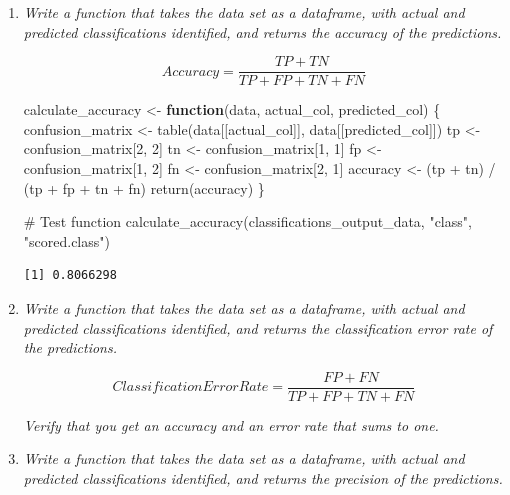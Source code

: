 \documentclass[
  11pt]{article}
\newenvironment{Shaded}{\begin{snugshade}}{\end{snugshade}}
\newcommand{\CommentTok}[1]{\textcolor[rgb]{0.37,0.37,0.37}{#1}}
\newcommand{\ControlFlowTok}[1]{\textcolor[rgb]{0.00,0.23,0.31}{\textbf{#1}}}
\newcommand{\DecValTok}[1]{\textcolor[rgb]{0.68,0.00,0.00}{#1}}
\newcommand{\FunctionTok}[1]{\textcolor[rgb]{0.28,0.35,0.67}{#1}}
\newcommand{\NormalTok}[1]{\textcolor[rgb]{0.00,0.23,0.31}{#1}}
\newcommand{\OtherTok}[1]{\textcolor[rgb]{0.00,0.23,0.31}{#1}}
\newcommand{\SpecialCharTok}[1]{\textcolor[rgb]{0.37,0.37,0.37}{#1}}
\newcommand{\StringTok}[1]{\textcolor[rgb]{0.13,0.47,0.30}{#1}}
\begin{document}
\begin{enumerate}
\def\labelenumi{\arabic{enumi}.}
\setcounter{enumi}{2}
\item
  \emph{Write a function that takes the data set as a dataframe, with
  actual and predicted classifications identified, and returns the
  accuracy of the predictions.}

  \[
  𝐴𝑐𝑐𝑢𝑟𝑎𝑐𝑦 = \frac{𝑇𝑃 + 𝑇𝑁}{𝑇𝑃 + 𝐹𝑃 + 𝑇𝑁 + 𝐹𝑁}
  \]

\begin{Shaded}
\begin{Highlighting}[]
\NormalTok{calculate\_accuracy }\OtherTok{\textless{}{-}} \ControlFlowTok{function}\NormalTok{(data, actual\_col, predicted\_col) \{}
\NormalTok{confusion\_matrix }\OtherTok{\textless{}{-}} \FunctionTok{table}\NormalTok{(data[[actual\_col]], data[[predicted\_col]])}
\NormalTok{tp }\OtherTok{\textless{}{-}}\NormalTok{ confusion\_matrix[}\DecValTok{2}\NormalTok{, }\DecValTok{2}\NormalTok{]}
\NormalTok{tn }\OtherTok{\textless{}{-}}\NormalTok{ confusion\_matrix[}\DecValTok{1}\NormalTok{, }\DecValTok{1}\NormalTok{]}
\NormalTok{fp }\OtherTok{\textless{}{-}}\NormalTok{ confusion\_matrix[}\DecValTok{1}\NormalTok{, }\DecValTok{2}\NormalTok{]}
\NormalTok{fn }\OtherTok{\textless{}{-}}\NormalTok{ confusion\_matrix[}\DecValTok{2}\NormalTok{, }\DecValTok{1}\NormalTok{]}
\NormalTok{accuracy }\OtherTok{\textless{}{-}}\NormalTok{ (tp }\SpecialCharTok{+}\NormalTok{ tn) }\SpecialCharTok{/}\NormalTok{ (tp }\SpecialCharTok{+}\NormalTok{ fp }\SpecialCharTok{+}\NormalTok{ tn }\SpecialCharTok{+}\NormalTok{ fn)}
\FunctionTok{return}\NormalTok{(accuracy)}
\NormalTok{\}}

\CommentTok{\# Test function}
\FunctionTok{calculate\_accuracy}\NormalTok{(classifications\_output\_data, }\StringTok{"class"}\NormalTok{, }\StringTok{"scored.class"}\NormalTok{)}
\end{Highlighting}
\end{Shaded}

\begin{verbatim}
[1] 0.8066298
\end{verbatim}
\item
  \emph{Write a function that takes the data set as a dataframe, with
  actual and predicted classifications identified, and returns the
  classification error rate of the predictions.}

  \[
  𝐶𝑙𝑎𝑠𝑠𝑖𝑓𝑖𝑐𝑎𝑡𝑖𝑜𝑛 𝐸𝑟𝑟𝑜𝑟 𝑅𝑎𝑡𝑒 = \frac{𝐹𝑃 + 𝐹𝑁}{𝑇𝑃 + 𝐹𝑃 + 𝑇𝑁 + 𝐹𝑁}
  \]

  \emph{Verify that you get an accuracy and an error rate that sums to
  one.}
\item
  \emph{Write a function that takes the data set as a dataframe, with
  actual and predicted classifications identified, and returns the
  precision of the predictions.}


\end{enumerate}
\end{document}
